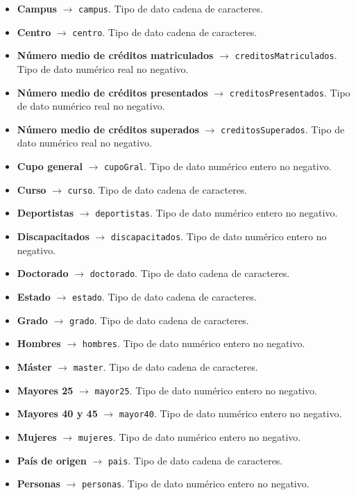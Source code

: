 \begin{itemize}
	\item \textbf{Campus} $\rightarrow$ {\tt campus}. Tipo de dato cadena de caracteres.
	\item \textbf{Centro} $\rightarrow$ {\tt centro}. Tipo de dato cadena de caracteres.
	\item \textbf{Número medio de créditos matriculados} $\rightarrow$ {\tt creditosMatriculados}. Tipo de dato numérico real no negativo.
	\item \textbf{Número medio de créditos presentados} $\rightarrow$ {\tt creditosPresentados}. Tipo de dato numérico real no negativo.
	\item \textbf{Número medio de créditos superados} $\rightarrow$ {\tt creditosSuperados}. Tipo de dato numérico real no negativo.
	\item \textbf{Cupo general} $\rightarrow$ {\tt cupoGral}. Tipo de dato numérico entero no negativo.
	\item \textbf{Curso} $\rightarrow$ {\tt curso}. Tipo de dato cadena de caracteres.
	\item \textbf{Deportistas} $\rightarrow$ {\tt deportistas}. Tipo de dato numérico entero no negativo.
	\item \textbf{Discapacitados} $\rightarrow$ {\tt discapacitados}. Tipo de dato numérico entero no negativo.
	\item \textbf{Doctorado} $\rightarrow$ {\tt doctorado}. Tipo de dato cadena de caracteres.
	\item \textbf{Estado} $\rightarrow$ {\tt estado}. Tipo de dato cadena de caracteres.
	\item \textbf{Grado} $\rightarrow$ {\tt grado}. Tipo de dato cadena de caracteres.
	\item \textbf{Hombres} $\rightarrow$ {\tt hombres}. Tipo de dato numérico entero no negativo.
	\item \textbf{Máster} $\rightarrow$ {\tt master}. Tipo de dato cadena de caracteres.
	\item \textbf{Mayores 25} $\rightarrow$ {\tt mayor25}. Tipo de dato numérico entero no negativo.
	\item \textbf{Mayores 40 y 45 } $\rightarrow$ {\tt mayor40}. Tipo de dato numérico entero no negativo.
	\item \textbf{Mujeres} $\rightarrow$ {\tt mujeres}. Tipo de dato numérico entero no negativo.
	\item \textbf{País de origen} $\rightarrow$ {\tt pais}. Tipo de dato cadena de caracteres.
	\item \textbf{Personas} $\rightarrow$ {\tt personas}. Tipo de dato numérico entero no negativo.

\end{itemize}
